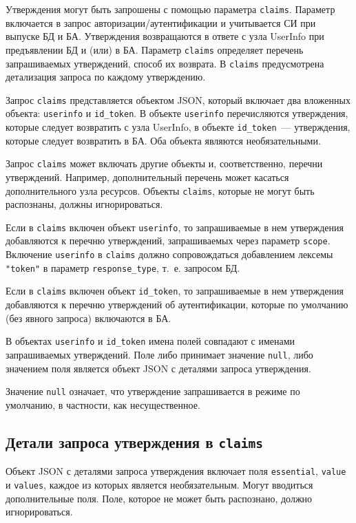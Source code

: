 Утверждения могут быть запрошены с помощью параметра \lstinline{claims}. 
Параметр включается в запрос авторизации/аутентификации и учитывается СИ при 
выпуске БД и БА.
%
Утверждения возвращаются в ответе с узла UserInfo при предъявлении БД и (или) в 
БА. 
%
Параметр \lstinline{claims} определяет перечень запрашиваемых утверждений, 
способ их возврата. 
%
В \lstinline{claims} предусмотрена детализация запроса по каждому утверждению.

Запрос \lstinline{claims} представляется объектом JSON, который включает два 
вложенных объекта: \lstinline{userinfo} и \lstinline{id_token}.
%
В объекте \lstinline{userinfo} перечисляются утверждения, которые следует возвратить 
с узла UserInfo, в объекте \lstinline{id_token}~--- утверждения, которые 
следует возвратить в БА.
%
Оба объекта являются необязательными.

Запрос \lstinline{claims} может включать другие объекты и, соответственно, 
перечни утверждений. Например, дополнительный перечень может касаться 
дополнительного узла ресурсов. Объекты \lstinline{claims}, которые не могут 
быть распознаны, должны игнорироваться.

Если в \lstinline{claims} включен объект \lstinline{userinfo}, то запрашиваемые 
в нем утверждения добавляются к перечню утверждений, запрашиваемых через 
параметр \lstinline{scope}. Включение \lstinline{userinfo} в \lstinline{claims}
должно сопровождаться добавлением лексемы \lstinline{"token"} в параметр
\lstinline{response_type}, т.~е. запросом БД.

Если в \lstinline{claims} включен объект \lstinline{id_token}, то запрашиваемые 
в нем утверждения добавляются к перечню утверждений об аутентификации, 
которые по умолчанию (без явного запроса) включаются в БА. 

В объектах \lstinline{userinfo} и \lstinline{id_token} имена полей совпадают
с именами запрашиваемых утверждений. Поле либо принимает значение 
\lstinline{null}, либо значением поля является объект JSON с деталями запроса 
утверждения. 

Значение \lstinline{null} означает, что утверждение запрашивается
в режиме по умолчанию, в частности, как несущественное. 

\subsection{Детали запроса утверждения в \lstinline{claims}}\label{CLAIMS.IndClaim}

Объект JSON с деталями запроса утверждения включает поля 
\lstinline{essential}, \lstinline{value} и \lstinline{values},
каждое из которых является необязательным.
%
Могут вводиться дополнительные поля.  
%
Поле, которое не может быть распознано, должно игнорироваться.

